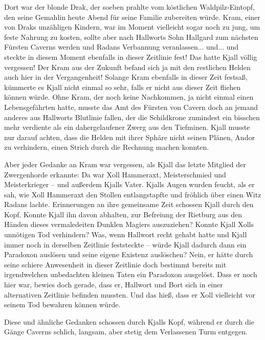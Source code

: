 \documentclass[10pt, a4paper, oneside]{book}
\begin{document}
Dort war der blonde Drak, der soeben prahlte vom köstlichen Waldpilz-Eintopf, den seine Gemahlin heute Abend für seine Familie zubereiten würde. Kram, einer von Draks unzähligen Kindern, war im Moment vielleicht sogar noch zu jung, um feste Nahrung zu kosten, sollte aber nach Hallworts Sohn Hallgard zum nächsten Fürsten Caverns werden und Radans Verbannung veranlassen... und... und steckte in diesem Moment ebenfalls in dieser Zeitlinie fest! Das hatte Kjall völlig vergessen! Der Kram aus der Zukunft befand sich ja mit den restlichen Helden auch hier in der Vergangenheit! Solange Kram ebenfalls in dieser Zeit festsaß, kümmerte es Kjall nicht einmal so sehr, falls er nicht aus dieser Zeit fliehen können würde. Ohne Kram, der noch keine Nachkommen, ja nicht einmal einen Lebensgefährten hatte, musste das Amt des Fürsten von Cavern doch an jemand anderes aus Hallworts Blutlinie fallen, der die Schildkrone zumindest ein bisschen mehr verdiente als ein dahergelaufener Zwerg aus den Tiefminen. Kjall musste nur darauf achten, dass die Helden mit ihrer Sphäre nicht seinen Plänen, Andor zu verhindern, einen Strich durch die Rechnung machen konnten.

Aber jeder Gedanke an Kram war vergessen, als Kjall das letzte Mitglied der Zwergenhorde erkannte: Da war Xoll Hammeraxt, Meisterschmied und Meisterkrieger – und außerdem Kjalls Vater. Kjalls Augen wurden feucht, als er sah, wie Xoll Hammeraxt den Stollen entlangstapfte und fröhlich über einen Witz Radans lachte. Erinnerungen an ihre gemeinsame Zeit schossen Kjall durch den Kopf. Konnte Kjall ihn davon abhalten, zur Befreiung der Rietburg aus den Händen dieses vermaledeiten Dunklen Magiers auszuziehen? Konnte Kjall Xolls unnötigen Tod verhindern? Was, wenn Hallwort recht gehabt hatte und Kjall immer noch in derselben Zeitlinie feststeckte – würde Kjall dadurch dann ein Paradoxon auslösen und seine eigene Existenz auslöschen? Nein, er hätte durch seine schiere Anwesenheit in dieser Zeitlinie doch bestimmt bereits mit irgendwelchen unbedachten kleinen Taten ein Paradoxon ausgelöst. Dass er noch hier war, bewies doch gerade, dass er, Hallwort und Bort sich in einer alternativen Zeitlinie befinden mussten. Und das hieß, dass er Xoll vielleicht vor seinem Tod bewahren können würde.

Diese und ähnliche Gedanken schossen durch Kjalls Kopf, während er durch die Gänge Caverns schlich, langsam, aber stetig dem Verlassenen Turm entgegen.\bigskip
\end{document}
